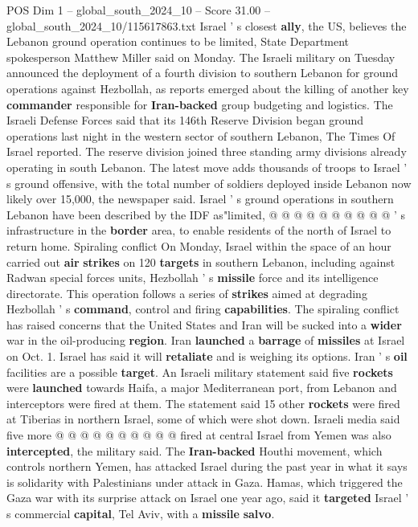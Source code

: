 \begin{textsample}{POS Dim 1 – global\_south\_2024\_10 – Score 31.00 – global\_south\_2024\_10/115617863.txt}
Israel ' s closest \textbf{ally}, the US, believes the Lebanon ground operation continues to be limited, State Department spokesperson Matthew Miller said on Monday.
The Israeli military on Tuesday announced the deployment of a fourth division to southern Lebanon for ground operations against Hezbollah, as reports emerged about the killing of another key \textbf{commander} responsible for \textbf{Iran-backed} group budgeting and logistics.
The Israeli Defense Forces said that its 146th Reserve Division began ground operations last night in the western sector of southern Lebanon, The Times Of Israel reported.
The reserve division joined three standing army divisions already operating in south Lebanon.
The latest move adds thousands of troops to Israel ' s ground offensive, with the total number of soldiers deployed inside Lebanon now likely over 15,000, the newspaper said.
Israel ' s ground operations in southern Lebanon have been described by the IDF as"limited, @ @ @ @ @ @ @ @ @ @ ' s infrastructure in the \textbf{border} area, to enable residents of the north of Israel to return home.
Spiraling conflict On Monday, Israel within the space of an hour carried out \textbf{air} \textbf{strikes} on 120 \textbf{targets} in southern Lebanon, including against Radwan special forces units, Hezbollah ' s \textbf{missile} force and its intelligence directorate.
This operation follows a series of \textbf{strikes} aimed at degrading Hezbollah ' s \textbf{command}, control and firing \textbf{capabilities}.
The spiraling conflict has raised concerns that the United States and Iran will be sucked into a \textbf{wider} war in the oil-producing \textbf{region}.
Iran \textbf{launched} a \textbf{barrage} of \textbf{missiles} at Israel on Oct. 1.
Israel has said it will \textbf{retaliate} and is weighing its options.
Iran ' s \textbf{oil} facilities are a possible \textbf{target}.
An Israeli military statement said five \textbf{rockets} were \textbf{launched} towards Haifa, a major Mediterranean port, from Lebanon and interceptors were fired at them.
The statement said 15 other \textbf{rockets} were fired at Tiberias in northern Israel, some of which were shot down.
Israeli media said five more @ @ @ @ @ @ @ @ @ @ fired at central Israel from Yemen was also \textbf{intercepted}, the military said.
The \textbf{Iran-backed} Houthi movement, which controls northern Yemen, has attacked Israel during the past year in what it says is solidarity with Palestinians under attack in Gaza.
Hamas, which triggered the Gaza war with its surprise attack on Israel one year ago, said it \textbf{targeted} Israel ' s commercial \textbf{capital}, Tel Aviv, with a \textbf{missile} \textbf{salvo}.

\end{textsample}
